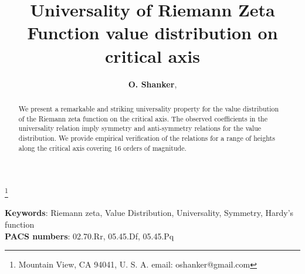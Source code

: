 \documentclass[twoside]{article}
\begin{document}


\newtheorem{theorem}{Theorem}[section]
\newtheorem{lemma}[theorem]{Lemma}

\theoremstyle{definition}
\newtheorem{definition}[theorem]{Definition}
\newtheorem{example}[theorem]{Example}
\newtheorem{xca}[theorem]{Exercise}

\theoremstyle{remark}
\newtheorem{remark}[theorem]{Remark}



\date{}
\lhead[]{}
\rhead[]{}

\title{\bf{Universality of Riemann Zeta Function value distribution on critical axis}}

\maketitle


\author{{\textbf{O. Shanker}},}
\thanks{ Mountain View, CA 94041, U. S. A. email: oshanker@gmail.com}

\thispagestyle{fancy}

\begin{abstract}
We present a remarkable and striking universality property for the value distribution
of the Riemann zeta function on the critical axis. The observed coefficients 
in the universality relation imply
symmetry and anti-symmetry relations for the value distribution.
We provide empirical verification of the relations for a range of heights along the critical
axis covering $16$ orders of magnitude.

\end{abstract}
{\textbf {Keywords}:} Riemann zeta, Value Distribution, Universality, Symmetry, Hardy's function
\\
{\textbf {PACS numbers}:}  02.70.Rr, 05.45.Df, 05.45.Pq



\end{document}
